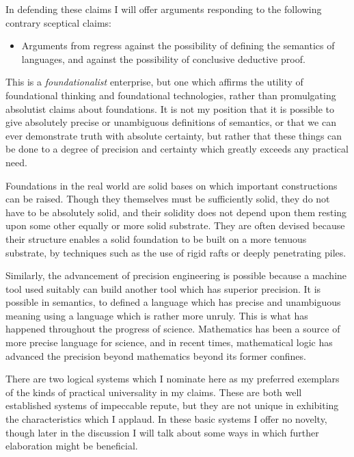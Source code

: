 \documentclass[10pt,titlepage]{book}
\begin{document}
In defending these claims I will offer arguments responding to the following contrary sceptical claims:

\begin{itemize}
\item Arguments from regress against the possibility of defining the semantics of languages, and against the possibility of conclusive deductive proof.
\end{itemize}

This is a \emph{foundationalist} enterprise, but one which affirms the utility of foundational thinking and foundational technologies, rather than promulgating absolutist claims about foundations.
It is not my position that it is possible to give absolutely precise or unambiguous definitions of semantics, or that we can ever demonstrate truth with absolute certainty, but rather that these things can be done to a degree of precision and certainty which greatly exceeds any practical need.

Foundations in the real world are solid bases on which important constructions can be raised.
Though they themselves must be sufficiently solid, they do not have to be absolutely solid, and their solidity does not depend upon them resting upon some other equally or more solid substrate.
They are often devised because their structure enables a solid foundation to be built on a more tenuous substrate, by techniques such as the use of rigid rafts or deeply penetrating piles.

Similarly, the advancement of precision engineering is possible because a machine tool used suitably can build another tool which has superior precision.
It is possible in semantics, to defined a language which has precise and unambiguous meaning using a language which is rather more unruly.
This is what has happened throughout the progress of science.
Mathematics has been a source of more precise language for science, and in recent times, mathematical logic has advanced the precision beyond mathematics beyond its former confines.

There are two logical systems which I nominate here as my preferred exemplars of the kinds of practical universality in my claims.
These are both well established systems of impeccable repute, but they are not unique in exhibiting the characteristics which I applaud.
In these basic systems I offer no novelty, though later in the discussion I will talk about some ways in which further elaboration might be beneficial.
\end{document}

